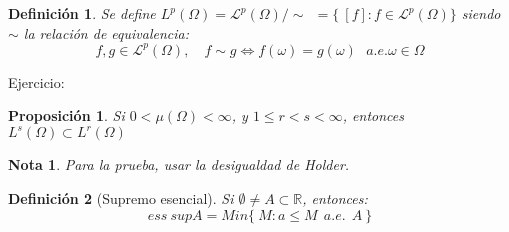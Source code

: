 \documentclass[11pt, a4paper]{article}
\newcommand{\R}{\mathbb{R}}
\theoremstyle{theorem-style}
\newtheorem{nprop}{Proposición}[section]
\theoremstyle{definition-style}
\newtheorem{ndef}{Definición}[section]
\theoremstyle{remark-style}
\newtheorem*{nota}{Nota}
\theoremstyle{example-style}
\begin{document}
\begin{ndef}
  Se define $L^p(\Omega) = \mathcal{L}^p(\Omega)/\sim \ \ = \{ \ [f] : f \in \mathcal{L}^p(\Omega) \} $ siendo $\sim$ la relación de equivalencia:
  \[
    f,g\in \mathcal{L}^p(\Omega), \quad f\sim  g \iff f(\omega)= g(\omega) \ \ \ a.e. \omega \in \Omega
  \]
  
\end{ndef}


Ejercicio:
\begin{nprop}
  Si $0 < \mu(\Omega) < \infty$, y $1\leq r < s < \infty $, entonces $L^s(\Omega) \subset L^r(\Omega)$
\end{nprop}
\begin{nota}
  Para la prueba, usar la desigualdad de Holder.
\end{nota}

\begin{ndef}[Supremo esencial]
  Si $\emptyset \ne A \subset \R$, entonces:
  \[
    ess \ sup A = Min\{ \ M : a \leq M \ \ a.e. \ \ A \ \}
  \]
\end{ndef}
\end{document}
